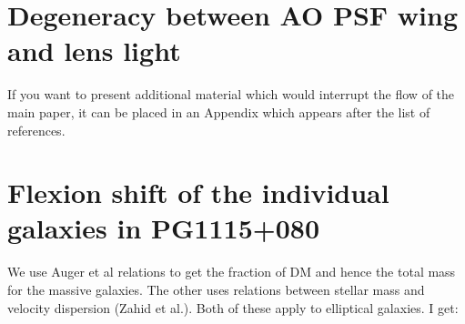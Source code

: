\documentclass[useAMS,usenatbib]{mnras}
\begin{document}








\appendix
\section{Degeneracy between AO PSF wing and lens light}
\label{Degeneracy}

If you want to present additional material which would interrupt the flow of the main paper,
it can be placed in an Appendix which appears after the list of references.

\section{Flexion shift of the individual galaxies in PG1115+080}
\label{flexion_shift}
We use Auger et al relations to get the fraction of DM and hence the total mass for the massive galaxies. The other uses relations between stellar mass and velocity dispersion (Zahid et al.). Both of these apply to elliptical galaxies. I get:
\end{document}
